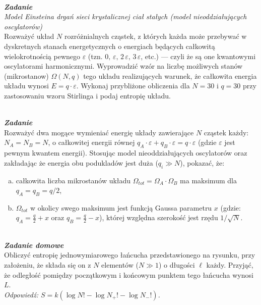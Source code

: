 \documentclass[11pt,a4paper]{article}
\newcounter{zadanie}\newcommand{\zadanie}[1][]{\addtocounter{zadanie}{1} ~\\  {\bf \emph{Zadanie \arabic{zadanie} #1 }} \\}
\newcounter{zaddom}\newcommand{\zaddom}[1][]{\addtocounter{zaddom}{1} ~\\  {\bf \emph{Zadanie domowe \arabic{zaddom} #1 }} \\}
\begin{document}
\zadanie
{\em Model Einsteina drgań sieci krystalicznej ciał stałych  (model nieoddziałujących oscylatorów)}\\
Rozważyć układ $N$ rozróżnialnych cząstek, z których każda może przebywać w dyskretnych stanach energetycznych o energiach będących całkowitą wielokrotnością pewnego $\varepsilon$ (tzn. $0,\,\varepsilon,\,2\,\varepsilon,\,3\,\varepsilon$, etc.) --- czyli że są one kwantowymi oscylatorami harmonicznymi. Wyprowadzić wzór na liczbę możliwych stanów (mikrostanow) $\Omega (N, q)$ tego układu realizujących warunek, że całkowita energia układu wynosi $E = q\cdot\varepsilon$. 
Wykonaj przybliżone obliczenia dla $N = 30$ i $q = 30$ przy zastosowaniu wzoru Stirlinga i podaj entropię układu.
\vspace{5mm} 


\zadanie
Rozważyć dwa mogące wymieniać energię układy zawierające $N$ cząstek każdy: $N_A = N_B = N$, 
o całkowitej energii równej $q_A\cdot\varepsilon + q_B\cdot\varepsilon = q\cdot\varepsilon$ (gdzie $\varepsilon$ jest pewnym kwantem energii). 
Stosując model nieoddziałujących oscylatorów oraz zakładając że energia obu podukladów jest duża ($q_i \gg N$), pokazać, że:
\begin{enumerate}[a)]
\item całkowita liczba mikrostanów układu 
      $\Omega_{tot} = \Omega_A \cdot \Omega_B$  
      ma maksimum dla $\displaystyle q_A = q_B = q/2$,
\item $\Omega_{tot}$ w okolicy swego maksimum jest funkcją Gaussa parametru 
      $x$ (gdzie: $\displaystyle q_A = \frac{q}{2} + x$ oraz\linebreak 
      $\displaystyle q_B = \frac{q}{2} - x$),
      której względna szerokość jest rzędu $1/\sqrt{N}$.
\end{enumerate}


\vspace*{1cm}

\begin{figure}\vspace{-3mm}
\end{figure}
\zaddom
Obliczyć entropię jednowymiarowego łańcucha przedstawionego na rysunku, przy założeniu,
że składa się on z $N$ elementów ($N\gg 1$) o długości $\ell$ każdy. 
Przyjąć, że odległość pomiędzy początkowym i
końcowym punktem tego łańcucha wynosi $L$.\\
{\it Odpowiedź: $S=k(\log N!-\log N_+!-\log N_-!)$.}
\end{document}

